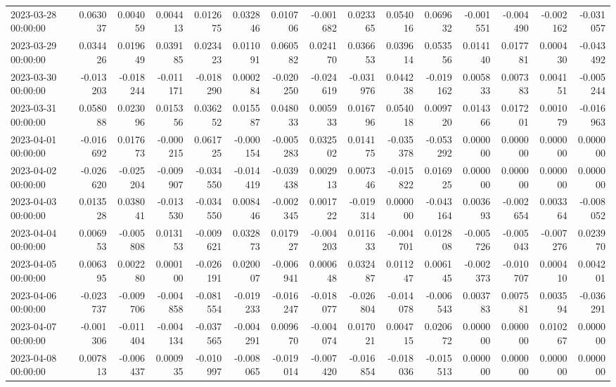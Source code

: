 \begin{tabular}{lrrrrrrrrrrrrrr}
2023-03-28 00:00:00 & 0.063037 & 0.004059 & 0.004413 & 0.012675 & 0.032846 & 0.010706 & -0.001682 & 0.023365 & 0.054016 & 0.069632 & -0.001551 & -0.004490 & -0.002162 & -0.031057 \\
2023-03-29 00:00:00 & 0.034426 & 0.019649 & 0.039185 & 0.023423 & 0.011091 & 0.060582 & 0.024170 & 0.036653 & 0.039614 & 0.053556 & 0.014140 & 0.017781 & 0.000430 & -0.043492 \\
2023-03-30 00:00:00 & -0.013203 & -0.018244 & -0.011171 & -0.018290 & 0.000284 & -0.020250 & -0.024619 & -0.031976 & 0.044238 & -0.019162 & 0.005833 & 0.007383 & 0.004151 & -0.005244 \\
2023-03-31 00:00:00 & 0.058088 & 0.023096 & 0.015356 & 0.036252 & 0.015587 & 0.048033 & 0.005933 & 0.016796 & 0.054018 & 0.009720 & 0.014366 & 0.017201 & 0.001079 & -0.016963 \\
2023-04-01 00:00:00 & -0.016692 & 0.017673 & -0.000215 & 0.061725 & -0.000154 & -0.005283 & 0.032502 & 0.014175 & -0.035378 & -0.053292 & 0.000000 & 0.000000 & 0.000000 & 0.000000 \\
2023-04-02 00:00:00 & -0.026620 & -0.025204 & -0.009907 & -0.034550 & -0.014419 & -0.039438 & 0.002913 & 0.007346 & -0.015822 & 0.016925 & 0.000000 & 0.000000 & 0.000000 & 0.000000 \\
2023-04-03 00:00:00 & 0.013528 & 0.038041 & -0.013530 & -0.034550 & 0.008446 & -0.002345 & 0.001722 & -0.019314 & 0.000000 & -0.043164 & 0.003693 & -0.002654 & 0.003364 & -0.008052 \\
2023-04-04 00:00:00 & 0.006953 & -0.005808 & 0.013153 & -0.009621 & 0.032873 & 0.017927 & -0.004203 & 0.011633 & -0.004701 & 0.012808 & -0.005726 & -0.005043 & -0.007276 & 0.023970 \\
2023-04-05 00:00:00 & 0.006395 & 0.002280 & 0.000100 & -0.026191 & 0.020007 & -0.006941 & 0.000648 & 0.032487 & 0.011247 & 0.006145 & -0.002373 & -0.010707 & 0.000410 & 0.004201 \\
2023-04-06 00:00:00 & -0.023737 & -0.009706 & -0.004858 & -0.081554 & -0.019233 & -0.016247 & -0.018077 & -0.026804 & -0.014078 & -0.006543 & 0.003783 & 0.007581 & 0.003594 & -0.036291 \\
2023-04-07 00:00:00 & -0.001306 & -0.011404 & -0.004134 & -0.037565 & -0.004291 & 0.009670 & -0.004074 & 0.017021 & 0.004715 & 0.020672 & 0.000000 & 0.000000 & 0.010267 & 0.000000 \\
2023-04-08 00:00:00 & 0.007813 & -0.006437 & 0.000935 & -0.010997 & -0.008065 & -0.019014 & -0.007420 & -0.016854 & -0.018036 & -0.015513 & 0.000000 & 0.000000 & 0.000000 & 0.000000 \\

\end{tabular}
